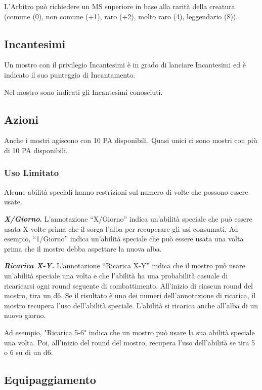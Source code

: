 \documentclass[12pt,a4paper,twoside,openany]{book}
\begin{document}
\begin{multicols}{2}
L'Arbitro può richiedere un MS superiore in base alla rarità della creatura (comune (0), non comune (+1), raro (+2), molto raro (4), leggendario (8)). 

\subsection{Incantesimi}

Un mostro con il privilegio Incantesimi è in grado di lanciare Incantesimi ed è indicato il suo punteggio di Incantamento.

Nel mostro sono indicati gli Incantesimi conosciuti.

\subsection{Azioni}

Anche i mostri agiscono con 10 PA disponibili. Quasi unici ci sono mostri con più di 10 PA disponibili.

\subsubsection{Uso Limitato}

Alcune abilità speciali hanno restrizioni sul numero di volte che possono essere usate.

\textbf{\textit{X/Giorno}.} L'annotazione ``X/Giorno'' indica un'abilità speciale che può essere usata X volte prima che il sorga l'alba per recuperare gli usi consumati. Ad esempio, ``1/Giorno'' indica un'abilità speciale che può essere usata una volta prima che il mostro debba aspettare la nuova alba.

\textit{\textbf{Ricarica X-Y.}} L'annotazione ``Ricarica X-Y'' indica che il mostro può usare un'abilità speciale una volta e che l'abilità ha una probabilità casuale di ricaricarsi ogni round seguente di combattimento. All'inizio di ciascun round del mostro, tira un d6. Se il risultato è uno dei numeri dell'annotazione di ricarica, il mostro recupera l'uso dell'abilità speciale. L'abilità si ricarica anche all'alba di un nuovo giorno.

Ad esempio, "Ricarica 5-6" indica che un mostro può usare la sua abilità speciale una volta. Poi, all'inizio del round del mostro, recupera l'uso dell'abilità se tira 5 o 6 su di un d6.

\subsection{Equipaggiamento}


\end{multicols}
\end{document}
